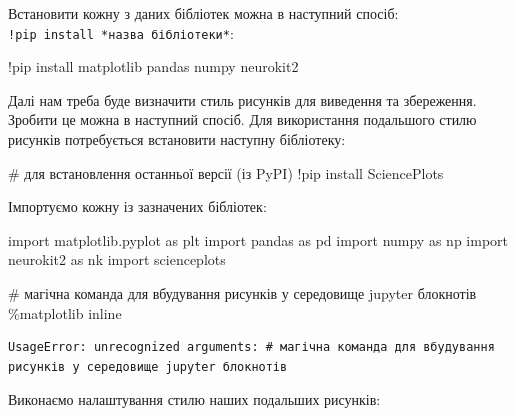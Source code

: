 \documentclass[
  letterpaper,
]{report}
\newenvironment{Shaded}{\begin{snugshade}}{\end{snugshade}}
\newcommand{\CommentTok}[1]{\textcolor[rgb]{0.37,0.37,0.37}{#1}}
\newcommand{\ImportTok}[1]{\textcolor[rgb]{0.00,0.46,0.62}{#1}}
\newcommand{\NormalTok}[1]{\textcolor[rgb]{0.00,0.23,0.31}{#1}}
\newcommand{\OperatorTok}[1]{\textcolor[rgb]{0.37,0.37,0.37}{#1}}
\begin{document}
Встановити кожну з даних бібліотек можна в наступний спосіб:
\texttt{!pip\ install\ *назва\ бібліотеки*}:

\begin{Shaded}
\begin{Highlighting}[]
\OperatorTok{!}\NormalTok{pip install matplotlib pandas numpy neurokit2}
\end{Highlighting}
\end{Shaded}

Далі нам треба буде визначити стиль рисунків для виведення та
збереження. Зробити це можна в наступний спосіб. Для використання
подальшого стилю рисунків потребується встановити наступну бібліотеку:

\begin{Shaded}
\begin{Highlighting}[]
\CommentTok{\# для встановлення останньої версії (із PyPI)}
\OperatorTok{!}\NormalTok{pip install SciencePlots}
\end{Highlighting}
\end{Shaded}

Імпортуємо кожну із зазначених бібліотек:

\begin{Shaded}
\begin{Highlighting}[]
\ImportTok{import}\NormalTok{ matplotlib.pyplot }\ImportTok{as}\NormalTok{ plt}
\ImportTok{import}\NormalTok{ pandas }\ImportTok{as}\NormalTok{ pd }
\ImportTok{import}\NormalTok{ numpy }\ImportTok{as}\NormalTok{ np}
\ImportTok{import}\NormalTok{ neurokit2 }\ImportTok{as}\NormalTok{ nk}
\ImportTok{import}\NormalTok{ scienceplots}

\CommentTok{\# магічна команда для вбудування рисунків у середовище jupyter блокнотів}
\OperatorTok{\%}\NormalTok{matplotlib inline  }
\end{Highlighting}
\end{Shaded}

\begin{verbatim}
UsageError: unrecognized arguments: # магічна команда для вбудування рисунків у середовище jupyter блокнотів
\end{verbatim}

Виконаємо налаштування стилю наших подальших рисунків:
\end{document}
